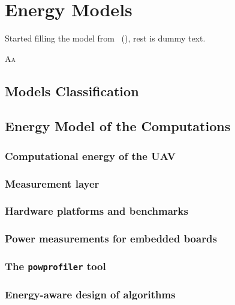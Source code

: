 \chapter{Energy Models}
\label{cp:model}

\begin{highlight}
    \begin{st}
        Started filling the model from~\citep{seewald202Xenergy} (), rest is dummy text.
    \end{st} 
\end{highlight}

\lettrine{A}{a}


\section{Models Classification}


\section{Energy Model of the Computations}

\subsection{Computational energy of the UAV}

\subsection{Measurement layer}

\subsection{Hardware platforms and benchmarks}

\subsection{Power measurements for embedded boards}

\subsection{The {\tt powprofiler} tool}

\subsection{Energy-aware design of algorithms}

